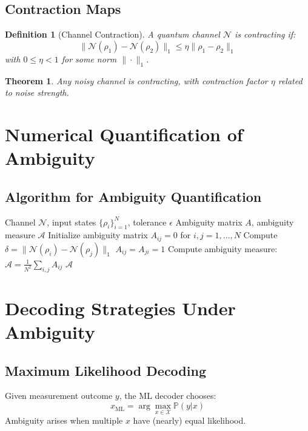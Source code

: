 \documentclass[12pt]{article}
\newtheorem{theorem}{Theorem}
\newtheorem{definition}{Definition}
\begin{document}
\subsection{Contraction Maps}
\begin{definition}[Channel Contraction]
A quantum channel $\mathcal{N}$ is contracting if:
\[
\|\mathcal{N}(\rho_1) - \mathcal{N}(\rho_2)\|_1 \leq \eta \|\rho_1 - \rho_2\|_1
\]
with $0 \leq \eta < 1$ for some norm $\|\cdot\|_1$.
\end{definition}

\begin{theorem}
Any noisy channel is contracting, with contraction factor $\eta$ related to noise strength.
\end{theorem}

\section{Numerical Quantification of Ambiguity}

\subsection{Algorithm for Ambiguity Quantification}
\begin{algorithmic}[1]
\Require Channel $\mathcal{N}$, input states $\{\rho_i\}_{i=1}^N$, tolerance $\epsilon$
\Ensure Ambiguity matrix $A$, ambiguity measure $\mathcal{A}$
\State Initialize ambiguity matrix $A_{ij} = 0$ for $i,j = 1,\ldots,N$
        \State Compute $\delta = \|\mathcal{N}(\rho_i) - \mathcal{N}(\rho_j)\|_1$
        \If{$\delta < \epsilon$}
            \State $A_{ij} = A_{ji} = 1$  %
        \EndIf
    \EndFor
\EndFor
\State Compute ambiguity measure: $\mathcal{A} = \frac{1}{N^2} \sum_{i,j} A_{ij}$
\State \Return $\mathcal{A}$
\end{algorithmic}

\section{Decoding Strategies Under Ambiguity}

\subsection{Maximum Likelihood Decoding}
Given measurement outcome $y$, the ML decoder chooses:
\[
\hat{x}_{\text{ML}} = \arg\max_{x \in \mathcal{X}} \mathbb{P}(y|x)
\]
Ambiguity arises when multiple $x$ have (nearly) equal likelihood.
\end{document}
